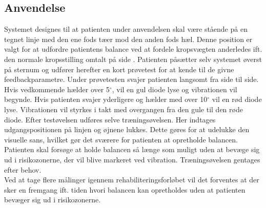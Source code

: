 \subsection{Anvendelse}
Systemet designes til at patienten under anvendelsen skal være stående på en tegnet linje med den ene fods tæer mod den anden fods hæl. Denne position er valgt for at udfordre patientens balance ved at fordele kropsvægten anderledes ift. den normale kropsstilling omtalt på side \pageref{BalanceAfsnit}. Patienten påsætter selv systemet øverst på sternum og udfører herefter en kort prøvetest for at kende til de givne feedbackparametre. Under prøvetesten svajer patienten langsomt fra side til side. Hvis vedkommende hælder over 5$^{\circ}$, vil en gul diode lyse og vibrationen vil begynde. Hvis patienten svajer yderligere og hælder med over 10$^{\circ}$ vil en rød diode lyse. Vibrationen vil styrkes i takt med overgangen fra den gule til den røde diode. Efter testøvelsen udføres selve træningsøvelsen. Her indtages udgangspositionen på linjen og øjnene lukkes. Dette gøres for at udelukke den visuelle sans, hvilket gør det sværere for patienten at opretholde balancen. Patienten skal forsøge at holde balancen så længe som muligt uden at bevæge sig ud i risikozonerne, der vil blive markeret ved vibration. Træningsøvelsen gentages efter behov. \\
Ved at tage flere målinger igennem rehabiliteringsforløbet vil det forventes at der sker en fremgang ift. tiden hvori balancen kan opretholdes uden at patienten bevæger sig ud i risikozonerne. 




